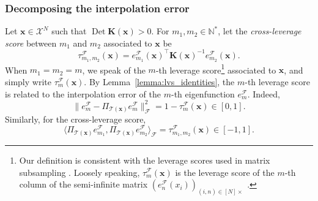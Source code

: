 \documentclass[twoside,11pt]{book}
\numberwithin{theorem}{chapter}
\numberwithin{definition}{chapter}
\numberwithin{proposition}{chapter}
\numberwithin{corollary}{chapter}
\numberwithin{example}{chapter}
\numberwithin{lemma}{chapter}
\DeclareMathOperator{\Det}{Det}
\DeclareMathOperator{\Tran}{\intercal}
\DeclareMathOperator{\F}{\mathcal{F}}
\DeclareMathOperator{\Ns}{\mathbb{N}^{*}}
\newcommand{\rb}[1]{\textcolor{magenta}{#1}}
\begin{document}
\subsubsection{Decomposing the interpolation error}
\label{sec:decomposition_error}
Let $\bm{x} \in \mathcal{X}^{N}$ such that $\Det \bm{K}(\bm{x}) > 0$. For $m_{1}, m_{2} \in \mathbb{N}^{*}$, let the \emph{cross-leverage score} between $m_{1}$ and $m_{2}$ associated to $\bm{x}$ be
\begin{equation}\label{eq:cross_lvs_def}
\tau_{m_{1},m_{2}}^{\F}(\bm{x}) = e_{m_{1}}^{\F}(\bm{x})^{\Tran} \bm{K}(\bm{x})^{-1} e_{m_{2}}^{\F}(\bm{x}).
\end{equation}
When $m_1=m_2=m$, we speak of the $m$-th leverage score\footnote{Our definition is consistent with the leverage scores used in matrix subsampling  \citep{DrMaMu06}. Loosely speaking, $\tau_{m}^{\F}(\bm{x})$ is the leverage score of the $m$-th column of the semi-infinite matrix  $(e_{n}^{\F}(x_{i}))_{(i,n) \in [N] \times \Ns}$.} associated to $\bm{x}$, and simply write $\tau_{m}^{\F}(\bm{x})$.
By Lemma~\ref{lemma:lvs_identities},
 the $m$-th leverage score is related to the interpolation error of the $m$-th eigenfunction $e_{m}^{\F}$. Indeed,
\begin{equation}
\|e_{m}^{\F} - \Pi_{\mathcal{T}(\bm{x})} e_{m}^{\F}\|_{\F}^{2} = 1- \tau_{m}^{\F}(\bm{x}) \in [0,1].
\end{equation}
Similarly, for the cross-leverage score,
\begin{equation}
\langle \Pi_{\mathcal{T}(\bm{x})} e_{m_{1}}^{\F}, \Pi_{\mathcal{T}(\bm{x})} e_{m_{2}}^{\F} \rangle_{\F} = \tau_{m_{1},m_{2}}^{\F}(\bm{x}) \in [-1,1].
\end{equation}
\end{document}

